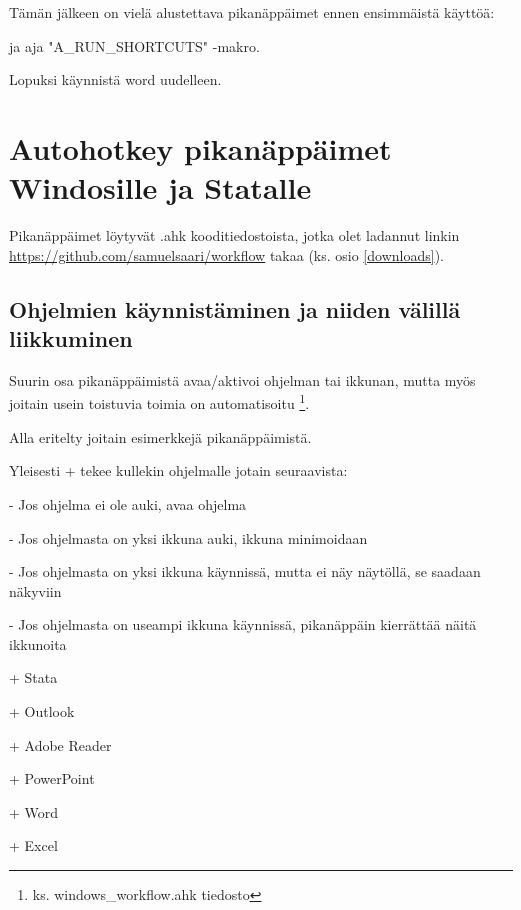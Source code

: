 \documentclass[a4paper,12pt]{scrartcl}
\begin{document}
Tämän jälkeen on vielä alustettava pikanäppäimet ennen ensimmäistä käyttöä:


 ja aja "A\_RUN\_SHORTCUTS" -makro.

Lopuksi käynnistä word uudelleen. 



\section{Autohotkey pikanäppäimet Windosille ja Statalle}
Pikanäppäimet löytyvät \*.ahk kooditiedostoista, jotka olet ladannut linkin \url{https://github.com/samuelsaari/workflow} takaa (ks. osio \ref{downloads}).

\subsection{Ohjelmien käynnistäminen ja niiden välillä liikkuminen}\label{roar}

Suurin osa pikanäppäimistä avaa/aktivoi ohjelman tai ikkunan, mutta myös joitain usein toistuvia toimia on automatisoitu \footnote{ks. windows\_workflow.ahk tiedosto}.

\medskip

Alla eritelty joitain esimerkkejä pikanäppäimistä.

Yleisesti + tekee kullekin ohjelmalle jotain seuraavista:

- Jos ohjelma ei ole auki, avaa ohjelma

- Jos ohjelmasta on yksi ikkuna auki, ikkuna minimoidaan

- Jos ohjelmasta on yksi ikkuna käynnissä, mutta ei näy näytöllä, se saadaan näkyviin

- Jos ohjelmasta on useampi ikkuna käynnissä, pikanäppäin kierrättää näitä ikkunoita

\medskip

+ Stata

+ Outlook

+ Adobe Reader

+ PowerPoint

+ Word

+ Excel
\end{document}
